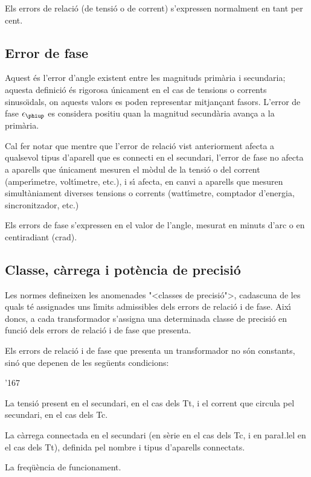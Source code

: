 Els errors de relaci\'{o} (de tensi\'{o} o de corrent) s'expressen
normalment en tant per cent.

\subsection{Error de fase}

Aquest \'{e}s l'error d'angle  existent entre les magnituds prim\`{a}ria i
secundaria; aquesta definici\'{o} \'{e}s rigorosa \'{u}nicament en el cas de
tensions o corrents sinuso\"{\i}dals, on aquests valors es poden
representar mitjan\c{c}ant fasors. L'error de fase $\epsilon\ped{\phiup}$ es considera positiu quan la magnitud secund\`{a}ria avan\c{c}a a la prim\`{a}ria.
\index{$\epsilon\ped{\phiup}$}

 Cal fer notar que mentre que l'error de relaci\'{o}
vist anteriorment afecta a qualsevol tipus d'aparell que es
connecti en el secundari, l'error de fase no afecta a aparells que
\'{u}nicament mesuren el m\`{o}dul de la tensi\'{o} o del corrent (amper\'{\i}metre,
volt\'{\i}metre, etc.), i s\'{\i} afecta, en canvi a aparells que mesuren
simult\`{a}niament diverses tensions o corrents (watt\'{\i}metre, comptador
d'energia, sincronitzador, etc.)

Els errors de fase s'expressen en el valor de l'angle, mesurat en
minuts d'arc o en centiradiant (crad).

\subsection{Classe, c\`{a}rrega i pot\`{e}ncia de precisi\'{o}}

Les normes defineixen les anomenades {"<}classes de precisi\'{o}{">},
cadascuna de les quals t\'{e} assignades uns l\'{\i}mits admissibles dels
errors de relaci\'{o} i de fase. Aix\'{\i} doncs, a cada transformador
s'assigna una determinada classe de precisi\'{o} en funci\'{o} dels errors
de relaci\'{o} i de fase que presenta.

Els errors de relaci\'{o} i de fase que presenta un transformador no s\'{o}n
constants, sin\'{o} que depenen de les seg\"{u}ents condicions:
\begin{dinglist}{'167}
   \item La tensi\'{o} present en el secundari, en el cas dels Tt, i el corrent que
   circula    pel secundari, en el cas dels Tc.
   \item La c\`{a}rrega connectada en el secundari (en s\`{e}rie en el cas dels Tc,
   i en para{\l.l}el en el cas dels Tt), definida pel nombre i tipus d'aparells connectats.
   \item La freq\"{u}\`{e}ncia de funcionament.
\end{dinglist}

